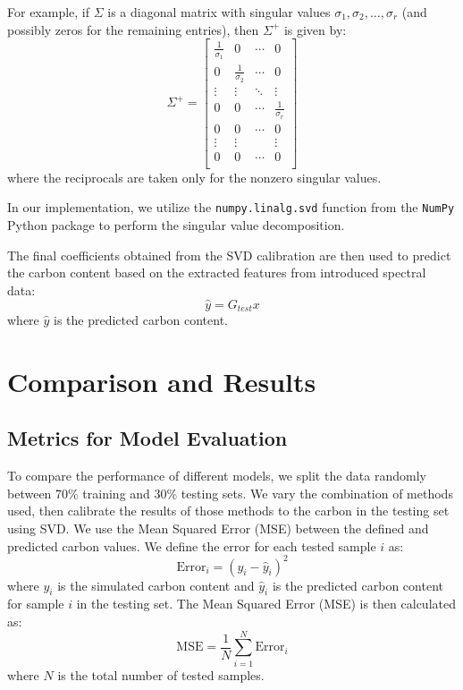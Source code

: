 \documentclass[preprint, 12pt]{elsarticle}
\begin{document}
For example, if $\Sigma$ is a diagonal matrix with singular values $\sigma_1, \sigma_2, \ldots, \sigma_r$ (and possibly zeros for the remaining entries), then $\Sigma^+$ is given by:
\begin{equation}
    \Sigma^+ = 
    \begin{bmatrix}
        \frac{1}{\sigma_1} & 0 & \cdots & 0 \\
        0 & \frac{1}{\sigma_2} & \cdots & 0 \\
        \vdots & \vdots & \ddots & \vdots \\
        0 & 0 & \cdots & \frac{1}{\sigma_r} \\
        0 & 0 & \cdots & 0 \\
        \vdots & \vdots & & \vdots \\
        0 & 0 & \cdots & 0 \\
    \end{bmatrix}
\end{equation}
where the reciprocals are taken only for the nonzero singular values.

In our implementation, we utilize the \texttt{numpy.linalg.svd} function from the \texttt{NumPy} \cite{harris2020array} Python package to perform the singular value decomposition.

The final coefficients obtained from the SVD calibration are then used to predict the carbon content based on the extracted features from introduced spectral data:
\begin{equation}
    \hat{y} = G_{test} x
\end{equation}
where $\hat{y}$ is the predicted carbon content.

\section{Comparison and Results}

\subsection{Metrics for Model Evaluation}

To compare the performance of different models, we split the data randomly between 70\% training and 30\% testing sets. We vary the combination of methods used, then calibrate the results of those methods to the carbon in the testing set using SVD. We use the Mean Squared Error (MSE) between the defined and predicted carbon values.
We define the error for each tested sample $i$ as:
\begin{equation}
    \text{Error}_i = (y_{i} - \hat{y}_{i})^2
\end{equation}
where $y_{i}$ is the simulated carbon content and $\hat{y}_{i}$ is the predicted carbon content for sample $i$ in the testing set.
The Mean Squared Error (MSE) is then calculated as:
\begin{equation}
    \text{MSE} = \frac{1}{N} \sum_{i=1}^{N} \text{Error}_i
\end{equation}
where $N$ is the total number of tested samples.
\end{document}

